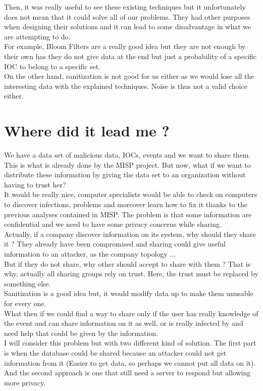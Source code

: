 \documentclass{eplmastersthesis}
\begin{document}
Then, it was really useful to see these existing techniques but it unfortunately does not mean that it could solve all of our problems. They had other purposes when designing their solutions and it can lead to some disadvantage in what we are attempting to do.\\
For example, Bloom Filters are a really good idea but they are not enough by their own has they do not give data at the end but just a probability of a specific IOC to belong to a specific set.\\
On the other hand, sanitization is not good for us either as we would lose all the interesting data with the explained techniques. Noise is thus not a valid choice either.


\section{Where did it lead me ?}

We have a data set of malicious data, IOCs, events and we want to share them. This is what is already done by the MISP project. But now, what if we want to distribute these information by giving the data set to an organization without having to trust her?\\
It would be really nice, computer specialists would be able to check on computers to discover infections, problems and moreover learn how to fix it thanks to the previous analyses contained in MISP. The problem is that some information are confidential and we need to have some privacy concerns while sharing. \\
Actually, if a company discover information on its system, why should they share it ? They already have been compromised and sharing could give useful information to an attacker, as the company topology ... \\
But if they do not share, why other should accept to share with them ? That is why, actually all sharing groups rely on trust. Here, the trust must be replaced by something else.\\
Sanitization is a good idea but, it would modify data up to make them unusable for every one.\\
What then if we could find a way to share only if the user has really knowledge of the event and can share information on it as well, or is really infected by and need help that could be given by the information.\\
I will consider this problem but with two different kind of solution. The first part is when the database could be shared because an attacker could not get information from it (Easier to get data, so perhaps we cannot put all data on it).\\
And the second approach is one that still need a server to respond but allowing more privacy.\\
\end{document}
